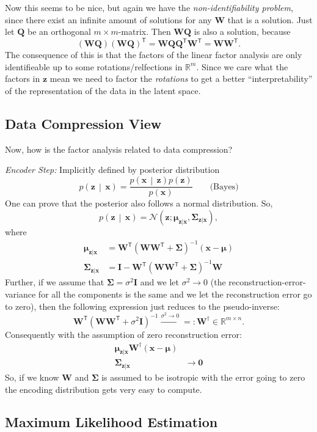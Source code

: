 \documentclass[a2paper,4pt]{extarticle}
\newcommand{\R}{\mathbb{R}}
\newcommand{\cN}{\mathcal{N}}
\newcommand{\cDist}[3]{#1\left( #2 \,\middle|\, #3 \right)}
\newcommand*{\T}{\mathsf{T}}
\newcommand{\mat}[1]{\mathbf{#1}}
\renewcommand{\vec}[1]{\mathbf{#1}}
\newcommand{\vx}{\vec{x}}
\newcommand{\vz}{\vec{z}}
\newcommand{\vmu}{\boldsymbol{\mu}}
\newcommand{\MI}{\mat{I}}
\newcommand{\MO}{\mat{0}}
\newcommand{\MQ}{\mat{Q}}
\newcommand{\MW}{\mat{W}}
\newcommand{\MSigma}{\mat{\Sigma}}
\begin{document}
\begin{landscape}
\begin{multicols*}{7}
Now this seems to be nice, but again we have the \emph{non-identifiability
problem}, since there exist an infinite amount of solutions for any $\MW$ that
is a solution. Just let $\MQ$ be an orthogonal $m\times m$-matrix. Then $\MW\MQ$
is also a solution, because
\[
(\MW\MQ)(\MW\MQ)^\T
=
\MW\MQ\MQ^\T\MW^\T
=\MW\MW^\T.
\]
The consequence of this is that the factors of the linear factor analysis are
only identifieable up to some rotations/relfections in $\R^m$. Since we care
what the factors in $\vz$ mean we need to factor the \emph{rotations} to get a
better ``interpretability'' of the representation of the data in the latent
space.

\subsection{Data Compression View}

Now, how is the factor analysis related to data compression?

\emph{Encoder Step:} Implicitly defined by posterior distribution
\[
\cDist{p}{\vz}{\vx}
=
\frac{
\cDist{p}{\vx}{\vz}
p(\vz)
}{
p(\vx)
}
\qquad
\text{(Bayes)}
\]
One can prove that the posterior also follows a normal distribution. So,
\[
\cDist{p}{\vz}{\vx}
=\cN(\vz;\vmu_{\vz|\vx},\MSigma_{\vz|\vx}),
\]
where
\begin{align*}
\vmu_{\vz|\vx}
&=
\MW^\T\left(\MW\MW^\T+\MSigma\right)^{-1}
(\vx-\vmu)
\\
\MSigma_{\vz|\vx}
&=
\MI-\MW^\T\left(\MW\MW^\T+\MSigma\right)^{-1}\MW
\end{align*}
Further, if we assume that $\MSigma=\sigma^2\MI$ and we let $\sigma^2\to 0$ (the
reconstruction-error-variance for all the components is the same and we let the
reconstruction error go to zero), then the following expression just reduces to the pseudo-inverse:
\[
\MW^\T\left(\MW\MW^\T+\sigma^2\MI\right)^{-1}
\stackrel{\sigma^2\to 0}{\to}
=:
\MW^\dagger\in\R^{m\times n}.
\]
Consequently with the assumption of zero reconstruction error:
\begin{align*}
\vmu_{\vz|\vx}
\MW^\dagger(\vx-\vmu)
\\
\MSigma_{\vz|\vx}
&\to
\MO
\end{align*}
So, if we know $\MW$ and $\MSigma$ is assumed to be isotropic with the error
going to zero the encoding distribution gets very easy to compute.

\subsection{Maximum Likelihood Estimation}


\end{multicols*}
\end{landscape}
\end{document}
